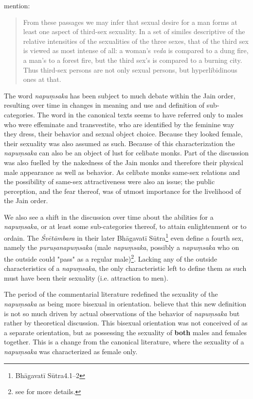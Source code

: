 \cite{zwilling} mention:

\begin{quote}
From these passages we may infer that sexual desire for a man forms at least one aspect of third-sex sexuality. In a set of similes descriptive of the relative intensities of the sexualities of the three sexes, that of the third sex is viewed as most intense of all: a woman's {\em veda} is compared to a dung fire, a man's to a forest fire, but the third sex's is compared to a burning city. Thus third-sex persons are not only sexual persons, but hyperlibidinous ones at that.
\end{quote}

The word {\em napuṃsaka} has been subject to much debate within the Jain order, resulting over time in changes in meaning and use and definition of sub-categories. The word in the canonical texts seems to have referred only to males who were effeminate and transvestite, who are identified by the feminine way they dress, their behavior and sexual object choice. Because they looked female, their sexuality was also assumed as such. Because of this characterization the {\em napuṃsaka} can also be an object of lust for celibate monks. Part of the discussion was also fuelled by the nakedness of the Jain monks and therefore their physical male appearance as well as behavior. As celibate monks same-sex relations and the possibility of same-sex attractiveness were also an issue; the public perception, and the fear thereof, was of utmost importance for the livelihood of the Jain order. 

We also see a shift in the discussion over time about the abilities for a {\em napuṃsaka}, or at least some sub-categories thereof, to attain enlightenment or to ordain. The {\em Śvētāmbara} in their later Bhāgavatī Sūtra\footnote{Bhāgavatī Sūtra4.1–2} even define a fourth sex, namely the {\em puruṣanapuṃsaka} (male {\em napuṃsaka}, possibly a {\em napuṃsaka} who on the outside could "pass" as a regular male)\footnote{see \cite{zwilling} for more details.}. Lacking any of the outside characteristics of a {\em napuṃsaka}, the only characteristic left to define them as such must have been their sexuality (i.e. attraction to men).

The period of the commentarial literature redefined the sexuality of the {\em napuṃsaka} as being more bisexual in orientation. \cite{zwilling} believe that this new definition is not so much driven by actual observations of the behavior of {\em napuṃsaka} but rather by theoretical discussion. This bisexual orientation was not conceived of as a separate orientation, but as possessing the sexuality of \textbf{both} males and females together. This is a change from the canonical literature, where the sexuality of a {\em napuṃsaka} was characterized as female only.

